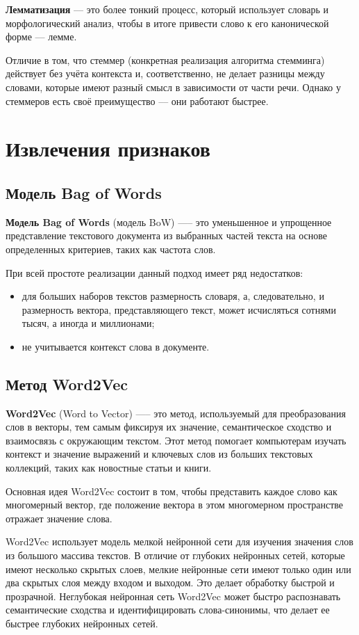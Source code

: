 \textbf{Лемматизация} –-- это более тонкий процесс, который использует словарь и морфологический анализ, чтобы в итоге привести слово к его канонической форме –-- лемме. 

Отличие в том, что стеммер (конкретная реализация алгоритма стемминга) действует без учёта контекста и, соответственно, не делает разницы между словами, которые имеют разный смысл в зависимости от части речи. Однако у стеммеров есть своё преимущество –-- они работают быстрее.
\section{Извлечения признаков}
\subsection{Модель Bag of Words}
\textbf{Модель Bag of Words} (модель BoW)\cite{phan1} —-- это уменьшенное и упрощенное представление текстового документа из выбранных частей текста на основе определенных критериев, таких как частота слов.

При всей простоте реализации данный подход имеет ряд недостатков:

\begin{itemize}[label = ---]
    \item для больших наборов текстов размерность словаря, а, следовательно, и размерность вектора, представляющего текст, может исчисляться сотнями тысяч, а иногда и миллионами;
    \item не учитывается контекст слова в документе.
\end{itemize}
\subsection{Метод Word2Vec}
\textbf{Word2Vec} (Word to Vector)\cite{phan1} —-- это метод, используемый для преобразования слов в векторы, тем самым фиксируя их значение, семантическое сходство и взаимосвязь с окружающим текстом. Этот метод помогает компьютерам изучать контекст и значение выражений и ключевых слов из больших текстовых коллекций, таких как новостные статьи и книги.

Основная идея Word2Vec состоит в том, чтобы представить каждое слово как многомерный вектор, где положение вектора в этом многомерном пространстве отражает значение слова.

Word2Vec использует модель мелкой нейронной сети для изучения значения слов из большого массива текстов. В отличие от глубоких нейронных сетей, которые имеют несколько скрытых слоев, мелкие нейронные сети имеют только один или два скрытых слоя между входом и выходом. Это делает обработку быстрой и прозрачной. Неглубокая нейронная сеть Word2Vec может быстро распознавать семантические сходства и идентифицировать слова-синонимы, что делает ее быстрее глубоких нейронных сетей.
